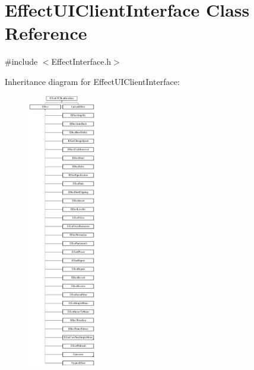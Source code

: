 \hypertarget{class_effect_u_i_client_interface}{}\section{Effect\+U\+I\+Client\+Interface Class Reference}
\label{class_effect_u_i_client_interface}


{\ttfamily \#include $<$Effect\+Interface.\+h$>$}

Inheritance diagram for Effect\+U\+I\+Client\+Interface\+:\begin{figure}[H]
\begin{center}
\leavevmode
\includegraphics[height=12.000000cm]{class_effect_u_i_client_interface}
\end{center}
\end{figure}

